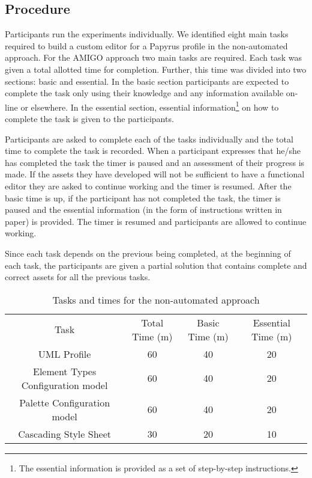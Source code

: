 \subsection{Procedure}
Participants run the experiments individually.
We identified eight main tasks required to build a custom editor for a Papyrus profile in the non-automated approach.
For the AMIGO approach two main tasks are required.
Each task was given a total allotted time for completion. Further, this time was divided into two sections: basic and essential.
In the basic section participants are expected to complete the task only using their knowledge and any information available on-line or elsewhere.
In the essential section, essential information\footnote{The essential information is provided as a set of step-by-step instructions.} on how to complete the task is given to the participants.

Participants are asked to complete each of the tasks individually and the total time to complete the task is recorded.
When a participant expresses that he/she has completed the task the timer is paused and an assessment of their progress is made.
If the assets they have developed will not be sufficient to have a functional editor they are asked to continue working and the timer is resumed.
After the basic time is up, if the participant has not completed the task, the timer is paused and the essential information (in the form of instructions written in paper)
is provided.
The timer is resumed and participants are allowed to continue working.

Since each task depends on the previous being completed, at the beginning of each task, the participants are given a partial solution that contains complete and correct assets for all the previous tasks.

\begin{table}
    \caption{Tasks and times for the non-automated approach}
    \centering
    \setlength{\tabcolsep}{3.5pt} 
    \begin{tabular}{|c|c|c|c|}
        Task & Total Time (m) & Basic Time (m) & Essential Time (m) \\ 
        UML Profile & 60 & 40 & 20 \\
        Element Types Configuration model & 60 & 40 & 20 \\
        Palette Configuration model & 60 & 40 & 20 \\
        Cascading Style Sheet & 30 & 20 & 10 \\
    \end{tabular}
\end{table}

